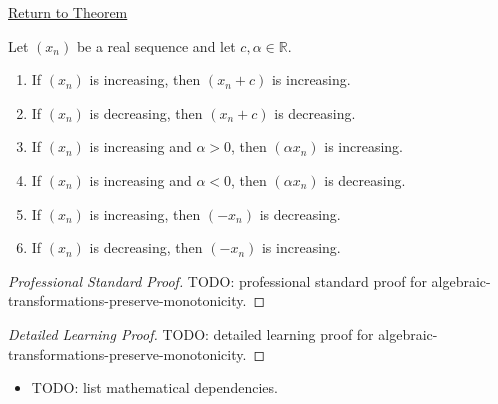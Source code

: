 \newpage
{}
\label{prf:algebraic-transformations-preserve-monotonicity}

\begin{remark*}[Return]
\hyperref[thm:algebraic-transformations-preserve-monotonicity]{Return to Theorem}
\end{remark*}

\begin{theorem*}
Let $(x_n)$ be a real sequence and let $c,\alpha\in\mathbb{R}$.
\begin{enumerate}[label=(\alph*)]
  \item If $(x_n)$ is increasing, then $(x_n+c)$ is increasing.
  \item If $(x_n)$ is decreasing, then $(x_n+c)$ is decreasing.
  \item If $(x_n)$ is increasing and $\alpha>0$, then $(\alpha x_n)$ is increasing.
  \item If $(x_n)$ is increasing and $\alpha<0$, then $(\alpha x_n)$ is decreasing.
  \item If $(x_n)$ is increasing, then $(-x_n)$ is decreasing.
  \item If $(x_n)$ is decreasing, then $(-x_n)$ is increasing.
\end{enumerate}

\smallskip
\noindent
\end{theorem*}

\begin{proof}[Professional Standard Proof]
\LRAProofBodyStart
TODO: professional standard proof for algebraic-transformations-preserve-monotonicity.
\end{proof}

\begin{proof}[Detailed Learning Proof]
\LRAProofBodyStart
TODO: detailed learning proof for algebraic-transformations-preserve-monotonicity.
\end{proof}

\begin{remark*}
\end{remark*}

\begin{dependencies}
\begin{itemize}
  \item TODO: list mathematical dependencies.
\end{itemize}
\end{dependencies}

\clearpage
